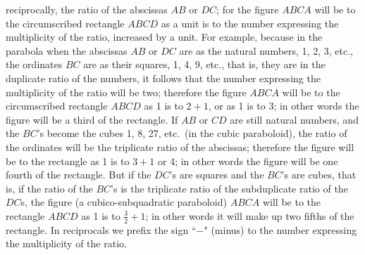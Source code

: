 \documentclass[twoside,openright]{article}
\begin{document}
reciprocally, the ratio of the abscissas $AB$ or $DC$; for the figure
$ABCA$ will be to the circumscribed rectangle $ABCD$ as a unit is to
the number expressing the multiplicity of the ratio, increased by a
unit. For example, because in
the parabola when the abscissas $AB$ or $DC$ are as the natural
numbers, 1, 2, 3, etc., the ordinates $BC$ are as their squares, 1, 4, 9, etc., that is,
they are in the duplicate ratio of the numbers, it follows that the
number expressing the multiplicity of the ratio will be two; therefore
the figure $ABCA$ will be to the circumscribed rectangle $ABCD$ as 1
is to $2+1$, or as 1 is to 3; in other words the figure will be a
third of the rectangle. If $AB$
or $CD$ are still natural numbers, and the $BC$'s become the cubes 1,
8, 27, etc.\ (in the cubic paraboloid), the ratio of the ordinates
will be the triplicate ratio of the abscissas; therefore the figure
will be to the rectangle as 1 is to $3+1$ or 4; in other words the
figure will be one fourth of the rectangle. But if the $DC$'s are squares and the $BC$'s are
cubes, that is, if the ratio of the $BC$'s is the triplicate ratio of
the subduplicate ratio of the $DC$s, the figure (a cubico-subquadratic
paraboloid) $ABCA$ will be to the rectangle $ABCD$ as 1 is to
$\frac{3}{2} + 1$; in other words it will make up two fifths of the
rectangle. In reciprocals we
prefix the sign ``$-$" (minus) to the number expressing the
multiplicity of the ratio.
\end{document}

